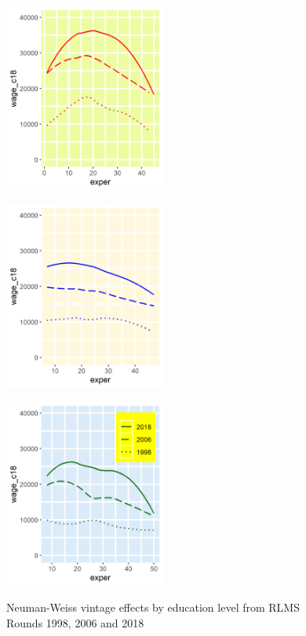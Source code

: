 \documentclass[12pt,a4paper]{article}
\numberwithin{equation}{section}
\begin{document}
	\begin{figure}[H]
		\begin{minipage}[b]{.3\linewidth}
			\centering
			\hspace*{-0.7in}
			\includegraphics[width=150pt]{dp01_he.png}
			\label{fig:4a}
		\end{minipage}
		\hfill
		\begin{minipage}[b]{.3\linewidth}
			\centering
			\hspace*{-0.7in}
			\includegraphics[width=150pt]{dp01_ve.png}
			\label{fig:4b}
		\end{minipage}
		\hfill
		\begin{minipage}[b]{.3\linewidth}
			\centering
			\hspace*{-0.7in}
			\includegraphics[width=150pt]{dp01_se.png}
			\label{fig:4c}
		\end{minipage}
		\caption{Neuman-Weiss vintage effects by education level from RLMS Rounds 1998, 2006 and 2018}\label{fig:4}
	\end{figure}
	
\end{document}
